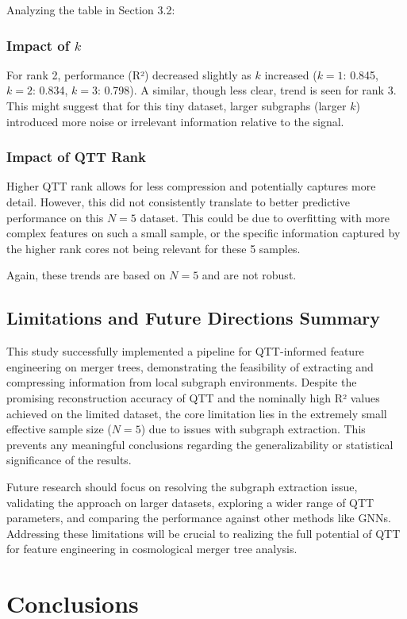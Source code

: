 \documentclass[twocolumn]{aastex631}
\begin{document}
Analyzing the table in Section 3.2:

\subsubsection{Impact of $k$}
For rank 2, performance (R²) decreased slightly as $k$ increased ($k=1$: 0.845, $k=2$: 0.834, $k=3$: 0.798). A similar, though less clear, trend is seen for rank 3. This might suggest that for this tiny dataset, larger subgraphs (larger $k$) introduced more noise or irrelevant information relative to the signal.

\subsubsection{Impact of QTT Rank}
Higher QTT rank allows for less compression and potentially captures more detail. However, this did not consistently translate to better predictive performance on this $N=5$ dataset. This could be due to overfitting with more complex features on such a small sample, or the specific information captured by the higher rank cores not being relevant for these 5 samples.

Again, these trends are based on $N=5$ and are not robust.

\subsection{Limitations and Future Directions Summary}

This study successfully implemented a pipeline for QTT-informed feature engineering on merger trees, demonstrating the feasibility of extracting and compressing information from local subgraph environments. Despite the promising reconstruction accuracy of QTT and the nominally high R² values achieved on the limited dataset, the core limitation lies in the extremely small effective sample size ($N=5$) due to issues with subgraph extraction. This prevents any meaningful conclusions regarding the generalizability or statistical significance of the results.

Future research should focus on resolving the subgraph extraction issue, validating the approach on larger datasets, exploring a wider range of QTT parameters, and comparing the performance against other methods like GNNs. Addressing these limitations will be crucial to realizing the full potential of QTT for feature engineering in cosmological merger tree analysis.

\section{Conclusions}
\label{sec:conclusions}
\end{document}
